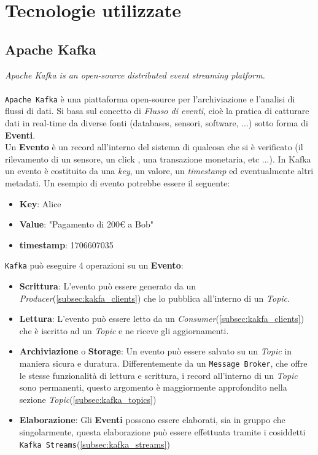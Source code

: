\chapter{Tecnologie utilizzate}
\label{ch:Tecnologies}

\section{Apache Kafka}
\label{ch:kafka_overview}
\textit{Apache Kafka is an open-source distributed event streaming platform.}\cite{kafkawebsite}\\\\
\texttt{Apache Kafka} è una piattaforma open-source per l'archiviazione e l'analisi di flussi di dati.
Si basa sul concetto di \textit{Flusso di eventi}, cioè la pratica di catturare dati in real-time da diverse fonti (databases, sensori, software, ...) sotto forma di \textbf{Eventi}.\\
Un \textbf{Evento} è un record all'interno del sistema di qualcosa che si è verificato (il rilevamento di un sensore, un click , una transazione monetaria, etc ...). In Kafka un evento è costituito da una \textit{key}, un valore, un \textit{timestamp} ed eventualmente altri metadati. Un esempio di evento potrebbe essere il seguente:
\begin{itemize}
    \item \textbf{Key}: Alice
    \item \textbf{Value}: "Pagamento di 200€ a Bob"
    \item \textbf{timestamp}: 1706607035
\end{itemize}
\texttt{Kafka} può eseguire 4 operazioni su un \textbf{Evento}:
\begin{itemize}
    \item \textbf{Scrittura}: L'evento può essere generato da un \textit{Producer}(\ref{subsec:kakfa_clients}) che lo pubblica all'interno di un \textit{Topic}.
    \item \textbf{Lettura}: L'evento può essere letto da un \textit{Consumer}(\ref{subsec:kakfa_clients}) che è iscritto ad un \textit{Topic} e ne riceve gli aggiornamenti.
    \item \textbf{Archiviazione} o \textbf{Storage}: Un evento può essere salvato su un \textit{Topic} in maniera sicura e duratura. Differentemente da un \texttt{Message Broker}, che offre le stesse funzionalità di lettura e scrittura, i record all'interno di un \textit{Topic} sono permanenti, questo argomento è maggiormente approfondito nella sezione \textit{Topic}(\ref{subsec:kafka_topics})
    \item \textbf{Elaborazione}: Gli \textbf{Eventi} possono essere elaborati, sia in gruppo che singolarmente, questa elaborazione può essere effettuata tramite i cosiddetti \texttt{Kafka Streams}(\ref{subsec:kafka_streams})
\end{itemize}
